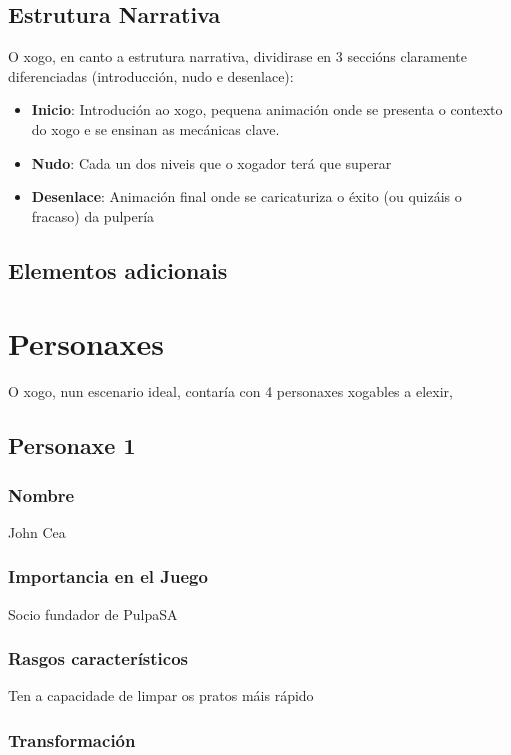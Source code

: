 \documentclass{report}  %
\begin{document}
\subsection{Estrutura Narrativa}

O xogo, en canto a estrutura narrativa, dividirase en 3 seccións claramente diferenciadas (introducción, nudo e desenlace):

\begin{itemize}
    \item \textbf{Inicio}: Introdución ao xogo, pequena animación onde se presenta o contexto do xogo e se ensinan as mecánicas clave.
    \item \textbf{Nudo}: Cada un dos niveis que o xogador terá que superar
    \item \textbf{Desenlace}: Animación final onde se caricaturiza o éxito (ou quizáis o fracaso) da pulpería
\end{itemize}

\subsection{Elementos adicionais}

\subsubsection{}

\section{Personaxes}
O xogo, nun escenario ideal, contaría con 4 personaxes xogables a elexir,

\subsection{Personaxe 1}
\subsubsection{Nombre}
John Cea
\subsubsection{Importancia en el Juego}
Socio fundador de PulpaSA
\subsubsection{Rasgos característicos}
Ten a capacidade de limpar os pratos máis rápido
\subsubsection{Transformación}
\end{document}
